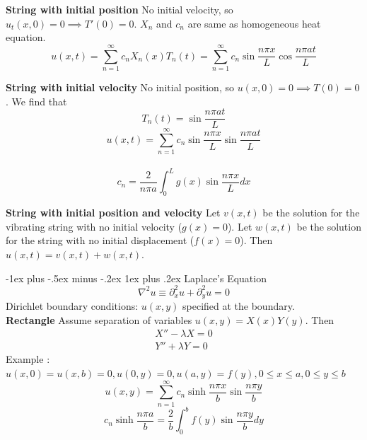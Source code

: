 \documentclass[10pt,landscape]{article}
\makeatletter
\newcommand{\lb}{\lambda}
\newcommand{\f}{\frac}
\renewcommand{\subsubsection}{\@startsection{subsubsection}{3}{0mm}%
                                {-1ex plus -.5ex minus -.2ex}%
                                {1ex plus .2ex}%
                                {\normalfont\small\bfseries}}
\makeatother
\begin{document}
\begin{multicols}{2}
		\textbf{String with initial position} No initial velocity, so $u_t(x,0) = 0 \implies T'(0) = 0$. $X_n$ and $c_n$ are same as homogeneous heat equation.
		$$ u(x,t) = \sum_{n=1}^{\infty} c_nX_n(x)T_n(t) = \sum_{n=1}^{\infty} c_n \sin{\f{n \pi x}{L}} \cos{\f{n \pi a t}{L}} $$

		\textbf{String with initial velocity} No initial position, so $u(x,0) = 0 \implies T(0) = 0$. We find that\\ $$ T_n(t) = \sin{\f{n \pi a t}{L}}$$
		$$ u(x,t) = \sum_{n=1}^{\infty} c_n \sin{\f{n \pi x}{L}} \sin{\f{n \pi a t}{L}} $$\\
		$$ c_n = \f{2}{n \pi a} \int_0^L g(x)  \sin{\f{n \pi x}{L}} dx $$

		\textbf{String with initial position and velocity} Let $v(x, t)$ be the solution for the vibrating string with no initial velocity ($g(x) = 0$). Let $w(x, t)$ be the solution for the string with no initial displacement ($f(x) = 0$). Then $u(x, t) = v(x, t) + w(x, t).$

		\subsubsection{Laplace's Equation}
		$$ \nabla^2u \equiv \partial_x^2 u + \partial_y^2 u = 0 $$
		Dirichlet boundary conditions: $u(x,y)$ specified at the boundary. \\
        \textbf{Rectangle} Assume separation of variables $u(x,y) = X(x)Y(y)$. Then \\
		\begin{align*}
			X'' - \lb X = 0 \\
			Y'' + \lb Y = 0 
		\end{align*}
		Example : $u(x,0)=u(x,b)=0, u(0,y) =0, u(a,y) = f(y), 0 \le x \le a, 0 \le y \le b$\\
		$$ u(x,y) =  \sum_{n=1}^{\infty} c_n \sinh{\f{n \pi x}{b}} \sin{\f{n \pi y}{b}} $$
		$$ c_n  \sinh{\f{n \pi a}{b}}  = \f{2}{b} \int_0^b f(y)  \sin{\f{n \pi y}{b}} dy $$


\end{multicols}
\end{document}
